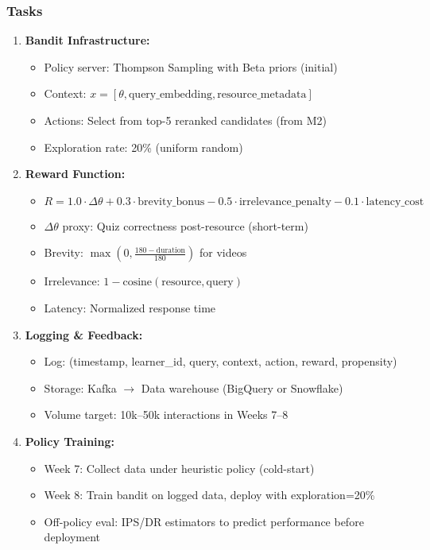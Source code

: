 \documentclass[11pt,letterpaper]{article}
\begin{document}
\subsubsection{Tasks}
\begin{enumerate}
\item \textbf{Bandit Infrastructure:}
\begin{itemize}
\item Policy server: Thompson Sampling with Beta priors (initial)
\item Context: $x = [\theta, \text{query\_embedding}, \text{resource\_metadata}]$
\item Actions: Select from top-5 reranked candidates (from M2)
\item Exploration rate: 20\% (uniform random)
\end{itemize}

\item \textbf{Reward Function:}
\begin{itemize}
\item $R = 1.0 \cdot \Delta\theta + 0.3 \cdot \text{brevity\_bonus} - 0.5 \cdot \text{irrelevance\_penalty} - 0.1 \cdot \text{latency\_cost}$
\item $\Delta\theta$ proxy: Quiz correctness post-resource (short-term)
\item Brevity: $\max(0, \frac{180 - \text{duration}}{180})$ for videos
\item Irrelevance: $1 - \text{cosine}(\text{resource}, \text{query})$
\item Latency: Normalized response time
\end{itemize}

\item \textbf{Logging \& Feedback:}
\begin{itemize}
\item Log: (timestamp, learner\_id, query, context, action, reward, propensity)
\item Storage: Kafka $\rightarrow$ Data warehouse (BigQuery or Snowflake)
\item Volume target: 10k--50k interactions in Weeks 7--8
\end{itemize}

\item \textbf{Policy Training:}
\begin{itemize}
\item Week 7: Collect data under heuristic policy (cold-start)
\item Week 8: Train bandit on logged data, deploy with exploration=20\%
\item Off-policy eval: IPS/DR estimators to predict performance before deployment
\end{itemize}


\end{enumerate}
\end{document}
